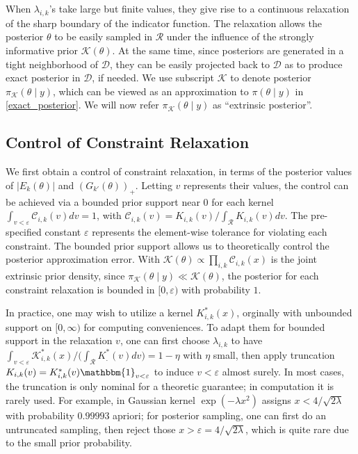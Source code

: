\documentclass[10pt]{article}
\newcommand{\mc}[1]{\mathcal{#1}}
\DeclareMathOperator{\1}{\mathbbm{1}}
\begin{document}
When $\lambda_{i,k}$'s take large but finite values, they give rise to a continuous relaxation of the sharp boundary of the indicator function. The relaxation allows the posterior $\theta$ to be easily sampled in $\mc R$ under the influence of the strongly informative prior $\mc K(\theta)$. At the same time, since posteriors are generated in a tight neighborhood of $\mc D$, they can be easily projected back to $\mc D$ as to produce exact posterior in $\mc D$, if needed. We use subscript $\mc K$ to denote posterior $\pi_{\mc K}(\theta \mid y)$, which can be viewed as an approximation to $\pi(\theta \mid y)$ in \eqref{exact_posterior}. We will now refer $\pi_{\mc K}(\theta \mid y)$ as ``extrinsic posterior''.

\subsection{Control of Constraint Relaxation}

We first obtain a control of constraint relaxation, in terms of the posterior values of $|E_k(\theta)|$ and $(G_{k'}(\theta))_+$. Letting $v$ represents their values, the control can be achieved via a bounded prior support near $0$ for each kernel $\int_{v<\varepsilon} \mc C_{i,k}(v)  dv= 1$, with  $\mc C_{i,k}(v) = K_{i,k}(v) / \int_{\mc R}K_{i,k}(v) dv$. The pre-specified constant $\varepsilon$ represents the element-wise tolerance for violating each constraint. The bounded prior support allows us to theoretically control the posterior approximation error. With $\mc K(\theta) \propto \prod_{i,k} \mc C_{i,k}(x)$ is the joint extrinsic prior density, since $\pi_{\mc K}(\theta \mid y) \ll \mc K(\theta)$, the posterior for each constraint relaxation is bounded in $[0,\varepsilon)$ with probability $1$.

In practice, one may wish to utilize a kernel $K^*_{i,k}(x)$, orginally with unbounded support on $[0,\infty)$ for computing conveniences. To adapt them for bounded support in the relaxation $v$, one can first choose $\lambda_{i,k}$ to have $\int_{v<\varepsilon} \mc K^*_{i,k}(x)/ \big( \int_{\mc R} K^*_{.}(v) dv\big ) = 1-\eta$ with $\eta$ small, then apply truncation $K_{i,k}(v)= K^*_{i,k}(v) \mathbbm{1}_{v<\varepsilon}$ to induce $v<\varepsilon$ almost surely. In most cases, the truncation is only nominal for a theoretic guarantee; in computation it is rarely used. For example, in Gaussian kernel $\exp( -{\lambda x^2})$ assigns $x<4/\sqrt{2\lambda}$ with probability $0.99993$ apriori; for posterior sampling, one can first do an untruncated sampling, then reject those $x>\varepsilon=4/\sqrt{2\lambda}$, which is quite rare due to the small prior probability. 
\end{document}
